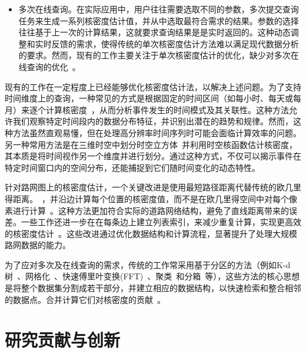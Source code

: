\begin{itemize}[leftmargin=*]
	\item 多次在线查询。在实际应用中，用户往往需要选取不同的参数，多次提交查询任务来生成一系列核密度估计值，并从中选取最符合需求的结果。参数的选择往往基于上一次的计算结果，这就要求查询结果是是实时返回的。这种动态调整和实时反馈的需求，使得传统的单次核密度估计方法难以满足现代数据分析的要求。然而，现有的工作主要关注于单次核密度估计的优化，缺少对多次在线查询的优化~\cite{gong_estimating_2014, gan_scalable_2017, plug_spatial_2011, brunsdon_visualising_2007, chan_safe_2021, cristianini_dynamically_1998, gramacki_nonparametric_2018}。
\end{itemize}

现有的工作在一定程度上已经能够优化核密度估计法，以解决上述问题。为了支持时间维度上的查询，一种常见的方式是根据固定的时间区间（如每小时、每天或每月）来逐个计算核密度~\cite{plug_spatial_2011}，从而分析事件发生的时间模式及其关联性。这种方法允许我们观察特定时间段内的数据分布特征，并识别出潜在的趋势和规律。然而，这种方法虽然直观易懂，但在处理高分辨率时间序列时可能会面临计算效率的问题。
另一种常用方法是在三维时空中划分时空立方体~\cite{nakaya_visualising_2010, black_highway_1991}并利用时空核函数估计核密度\cite{brunsdon_visualising_2007, romano_visualizing_2017, chan_sws_2021}，其本质是将时间视作另一个维度并进行划分。通过这种方式，不仅可以揭示事件在特定时间窗口内的空间分布，还能捕捉到它们随时间变化的动态特性。

针对路网图上的核密度估计，一个关键改进是使用最短路径距离代替传统的欧几里得距离。~\cite{borruso_network_2005}，并沿边计算每个位置的核密度值，而不是在欧几里得空间中对每个像素进行计算~\cite{xie_kernel_2008}。这种方法更加符合实际的道路网络结构，避免了直线距离带来的误差。一些工作还进一步在在每条边上建立列表索引，来减少重复计算，实现更高效的核密度估计~\cite{chan_fast_2021}。这些改进通过优化数据结构和计算流程，显著提升了处理大规模路网数据的能力。

为了应对多次及在线查询的需求，传统的工作常采用基于分区的方法（例如K-d树~\cite{chan_efficient_2020, chan_quad_2020, chan_karl_2019}、网格化~\cite{hart_kernel_2014, black_highway_1991}、快速傅里叶变换(FFT)~\cite{silverman_algorithm_1982, gramacki_nonparametric_2018}、聚类~\cite{auber_interactive_2005, abello_ask-graphview_2006, hinneburg_denclue_2007}和分箱~\cite{liu_immens_2013, gramacki_nonparametric_2018, li_interactive_2014}等），这些方法的核心思想是将整个数据集分割成若干部分，并建立相应的数据结构，以快速检索和整合相邻的数据点。合并计算它们对核密度的贡献~\cite{liu_immens_2013}。

\section{研究贡献与创新}

